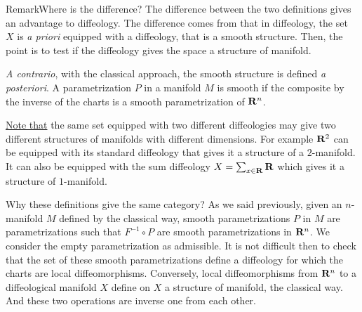 \begin{Article}{Remark}{}{Where is the difference?}
  The difference between the two definitions gives an advantage to diffeology.
  The difference comes from that in diffeology,
  the set $X$ is \emph{a priori} equipped with a diffeology,
  that is a smooth structure.
  Then,
  the point is to test if the diffeology gives the space a structure of manifold.

  \emph{A contrario},
  with the classical approach,
  the smooth structure is defined \emph{a posteriori}.
  A parametrization $P$ in a manifold $M$ is smooth if the composite by the inverse of the charts is a smooth parametrization of $\mathbf{R}^n$.

  \uline{Note that} the same set equipped with two different diffeologies may give two different structures of manifolds with different dimensions.
  For example $\mathbf{R}^2$ can be equipped with its standard diffeology that gives it a structure of a $2$-manifold.
  It can also be equipped with the sum diffeology $X = \sum_{x \in \mathbf{R}} \mathbf{R}$ which gives it a structure of $1$-manifold.
\end{Article}

\begin{Article}{Why these definitions give the same category?}{}
  As we said previously,
  given an $n$-manifold $M$ defined by the classical way,
  smooth parametrizations $P$ in $M$ are parametrizations such that $F^{-1} \circ P$ are smooth parametrizations in $\mathbf{R}^n$.
  We consider the empty parametrization as admissible.
  It is not difficult then to check that the set of these smooth parametrizations define a diffeology for which the charts are local diffeomorphisms.
  Conversely,
  local diffeomorphisms from $\mathbf{R}^n$ to a diffeological manifold $X$ define on $X$ a structure of manifold,
  the classical way.
  And these two operations are inverse one from each other.
\end{Article}

